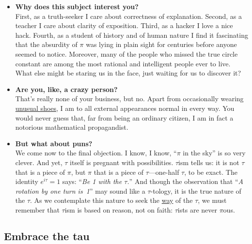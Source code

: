 \begin{itemize}
  \item \textbf{Why does this subject interest you?} \\ First, as a truth-seeker I care about correctness of explanation. Second, as a teacher I care about clarity of exposition. Third, as a hacker I love a nice hack. Fourth, as a student of history and of human nature I find it fascinating that the absurdity of $\pi$ was lying in plain sight for centuries before anyone seemed to notice. Moreover, many of the people who missed the true circle constant are among the most rational and intelligent people ever to live. What else might be staring us in the face, just waiting for us to discover it?

  \item \textbf{Are you, like, a crazy person?} \\ That's really none of your business, but no. Apart from occasionally wearing \href{http://www.vibramfivefingers.com/}{unusual shoes}, I am to all external appearances normal in every way. You would never guess that, far from being an ordinary citizen, I am in fact a notorious mathematical propagandist.

  \item \textbf{But what about puns?} \\ We come now to the final objection. I know, I know, ``$\pi$ in the sky'' is so very clever. And yet, $\tau$ itself is pregnant with possibilities. $\tau$ism tells us: it is not $\tau$ that is a piece of $\pi$, but $\pi$ that is a piece of $\tau$---one-half $\tau$, to be exact. The identity $e^{i\tau} = 1$ says: ``\emph{Be 1 with the $\tau$.}'' And though the observation that ``\emph{A rotation by one turn is~1}'' may sound like a $\tau$-tology, it is the true nature of the $\tau$. As we contemplate this nature to seek the \href{http://www.answers.com/Tao}{way} of the $\tau$, we must remember that $\tau$ism is based on reason, not on faith: $\tau$ists are never $\pi$ous.

\end{itemize}


  \subsection{Embrace the tau} %
  \label{sec:embrace_the_tau}

